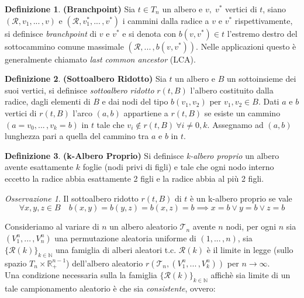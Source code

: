 \documentclass[11pt, twoside]{report}
\theoremstyle{definition}
\newtheorem{definizione}{Definizione}[chapter]
\theoremstyle{plain}
\theoremstyle{remark}
\newtheorem{oss}{Osservazione}[chapter]
\numberwithin{equation}{chapter}
\begin{document}
\begin{definizione}{\textbf{(Branchpoint)}} Sia $t \in T_n$ un albero e $v, \; v^*$ vertici di $t$, siano $(\mathcal{R}, v_1, ... \, , v)$ e $(\mathcal{R},v_1^*, ...\, , v^*)$ i cammini dalla radice a $v$ e $v^*$ rispettivamente, si definisce \textit{branchpoint} di $v$ e $v^*$ e si denota con $b(v,v^*) \in t$ l'estremo destro del sottocammino  
comune massimale $(\mathcal{R}, ...\, , b(v,v^*))$. Nelle applicazioni questo è generalmente chiamato \textit{last common ancestor} (LCA).
\end{definizione}

\begin{definizione}{\textbf{(Sottoalbero Ridotto)}}
Sia $t$ un albero e $B$ un sottoinsieme dei suoi vertici, si definisce \textit{sottoalbero ridotto} $r(t,B)$ l'albero costituito dalla radice, dagli elementi di $B$ e dai nodi del tipo $b(v_1,v_2)$ per $v_1, v_2 \in B$. Dati $a$ e $b$ vertici di $r(t,B)$ l'arco $(a,b)$ appartiene a $r(t,B)$ se esiste un cammino $(a=v_0, ... \, , v_k=b)$ in $t$ tale che $v_i \not\in r(t,B) \ \forall i\neq 0,k$. Assegnamo ad $(a,b)$ lunghezza pari a quella del cammino tra $a$ e $b$ in $t$.
\end{definizione}
\begin{definizione}{\textbf{(k-Albero Proprio)}}
Si definisce \textit{k-albero proprio} un albero avente esattamente $k$ foglie (nodi privi di figli) e tale che ogni nodo interno eccetto la radice abbia esattamente 2 figli e la radice abbia al più 2 figli.
\end{definizione}

\begin{oss}
Il sottoalbero ridotto $r(t,B)$ di $t$ è un k-albero proprio se vale 
\begin{equation}
\forall x,y,z \in B \quad b(x,y)=b(y,z)=b(x,z)=b \implies x=b \lor y=b \lor z=b
\end{equation}
\end{oss}

Consideriamo al variare di $n$ un albero aleatorio $\mathscr{T}_n$ avente $n$ nodi, per ogni $n$ sia $(V_1^n,... \, ,V_n^n)$ una permutazione aleatoria uniforme di $(1,...\, ,n)$, sia $\{\mathscr{R}(k)\}_{k \in \mathbb{N}}$ una famiglia di alberi aleatori t.c. $\mathscr{R}(k)$ è il limite in legge (sullo spazio $T_n \times \mathbb{R}_+^{n-1}$) dell'albero aleatorio $r(\mathscr{T}_n, (V_1^n, ... \, ,V_k^n))$ per $n \rightarrow \infty$.\\
Una condizione necessaria sulla la famiglia $\{\mathscr{R}(k)\}_{k \in \mathbb{N}}$ affichè sia limite di un tale campionamento aleatorio è che sia \textit{consistente}, ovvero:
\end{document}
